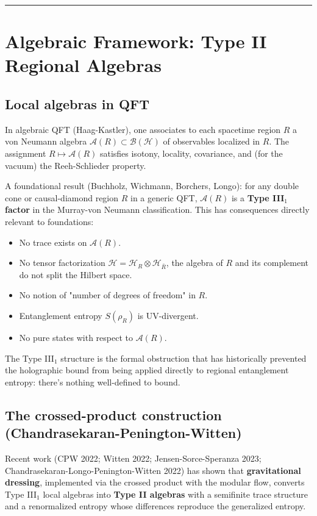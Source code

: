 \documentclass[11pt,a4paper]{article}
\begin{document}
\medskip\hrule\medskip

\section{Algebraic Framework: Type II Regional Algebras}

\subsection{Local algebras in QFT}

In algebraic QFT (Haag-Kastler), one associates to each spacetime region $R$ a von Neumann algebra $\mathcal{A}(R) \subset \mathcal{B}(\mathcal{H})$ of observables localized in $R$. The assignment $R \mapsto \mathcal{A}(R)$ satisfies isotony, locality, covariance, and (for the vacuum) the Reeh-Schlieder property.

A foundational result (Buchholz, Wichmann, Borchers, Longo): for any double cone or causal-diamond region $R$ in a generic QFT, $\mathcal{A}(R)$ is a \textbf{Type III$_1$ factor} in the Murray-von Neumann classification. This has consequences directly relevant to foundations:

\begin{itemize}
  \item No trace exists on $\mathcal{A}(R)$.
  \item No tensor factorization $\mathcal{H} = \mathcal{H}_R \otimes \mathcal{H}_{\bar R}$, the algebra of $R$ and its complement do not split the Hilbert space.
  \item No notion of "number of degrees of freedom" in $R$.
  \item Entanglement entropy $S(\rho_R)$ is UV-divergent.
  \item No pure states with respect to $\mathcal{A}(R)$.
\end{itemize}

The Type III$_1$ structure is the formal obstruction that has historically prevented the holographic bound from being applied directly to regional entanglement entropy: there's nothing well-defined to bound.

\subsection{The crossed-product construction (Chandrasekaran-Penington-Witten)}

Recent work (CPW 2022; Witten 2022; Jensen-Sorce-Speranza 2023; Chandrasekaran-Longo-Penington-Witten 2022) has shown that \textbf{gravitational dressing}, implemented via the crossed product with the modular flow, converts Type III$_1$ local algebras into \textbf{Type II algebras} with a semifinite trace structure and a renormalized entropy whose differences reproduce the generalized entropy.
\end{document}
